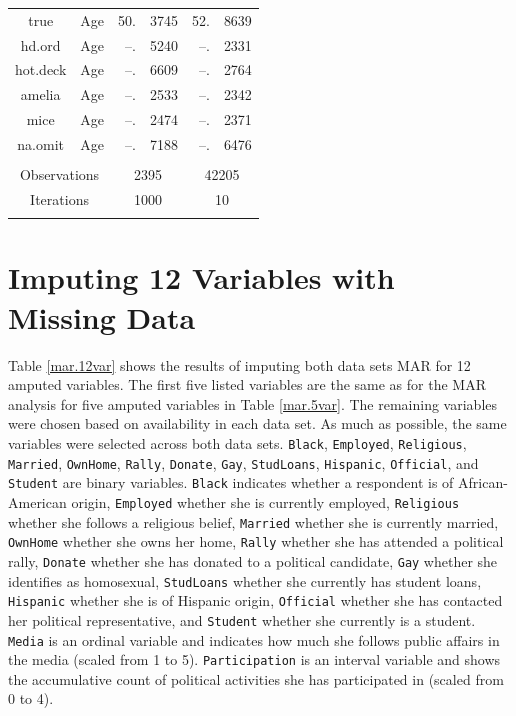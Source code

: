 \documentclass[12pt,econ]{sources/authesis}
\begin{document}
\begin{table}[!htbp]
\begin{tabular}{ccr@{}lr@{}l}
 true & Age & 50.&3745 & 52.&8639 \\ 
 hd.ord & Age & --.&5240 & --.&2331 \\
 hot.deck & Age & --.&6609 & --.&2764 \\
 amelia & Age & --.&2533 & --.&2342 \\
 mice & Age & --.&2474 & --.&2371 \\
 na.omit & Age & --.&7188 & --.&6476 \\
\hline \\[-1.8ex] 
\multicolumn{2}{c}{Observations} & \multicolumn{2}{c}{2395} & \multicolumn{2}{c}{42205} \\ 
\multicolumn{2}{c}{Iterations} & \multicolumn{2}{c}{1000} & \multicolumn{2}{c}{10} \\ 
\hline \\[-1.8ex] 
\end{tabular} 
\end{table}
\clearpage

\hypertarget{app-ordmiss-12var}{%
\section{Imputing 12 Variables with Missing Data}\label{app-ordmiss-12var}}

Table \ref{mar.12var} shows the results of imputing both data sets MAR for 12 amputed variables. The first five listed variables are the same as for the MAR analysis for five amputed variables in Table \ref{mar.5var}. The remaining variables were chosen based on availability in each data set. As much as possible, the same variables were selected across both data sets. \texttt{Black}, \texttt{Employed}, \texttt{Religious}, \texttt{Married}, \texttt{OwnHome}, \texttt{Rally}, \texttt{Donate}, \texttt{Gay}, \texttt{StudLoans}, \texttt{Hispanic}, \texttt{Official}, and \texttt{Student} are binary variables. \texttt{Black} indicates whether a respondent is of African-American origin, \texttt{Employed} whether she is currently employed, \texttt{Religious} whether she follows a religious belief, \texttt{Married} whether she is currently married, \texttt{OwnHome} whether she owns her home, \texttt{Rally} whether she has attended a political rally, \texttt{Donate} whether she has donated to a political candidate, \texttt{Gay} whether she identifies as homosexual, \texttt{StudLoans} whether she currently has student loans, \texttt{Hispanic} whether she is of Hispanic origin, \texttt{Official} whether she has contacted her political representative, and \texttt{Student} whether she currently is a student. \texttt{Media} is an ordinal variable and indicates how much she follows public affairs in the media (scaled from 1 to 5). \texttt{Participation} is an interval variable and shows the accumulative count of political activities she has participated in (scaled from 0 to 4).
\end{document}
